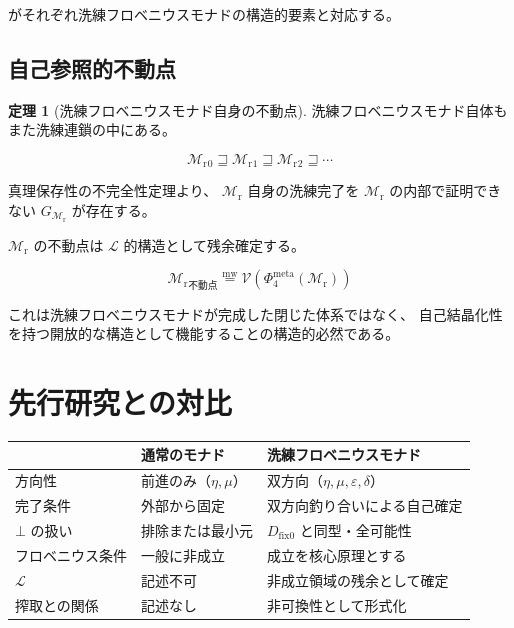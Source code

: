 \documentclass[11pt,a4paper]{article}
\theoremstyle{definition}
\newtheorem{theorem}{定理}[section]
\newcommand{\mweq}{\mathrel{\overset{\mathrm{mw}}{=}}}
\newcommand{\dfix}{D_{\mathrm{fix}0}}
\newcommand{\Lhagma}{\mathcal{L}}
\newcommand{\Mr}{\mathcal{M}_{\mathrm{r}}}
\begin{document}
がそれぞれ洗練フロベニウスモナドの構造的要素と対応する。

\subsection{自己参照的不動点}

\begin{theorem}[洗練フロベニウスモナド自身の不動点]
洗練フロベニウスモナド自体もまた洗練連鎖の中にある。

\begin{equation}
\Mr{}_0 \sqsupseteq \Mr{}_1 \sqsupseteq \Mr{}_2 \sqsupseteq \cdots
\end{equation}

真理保存性の不完全性定理\cite{Chiba2026_incompleteness}より、
$\Mr$ 自身の洗練完了を $\Mr$ の内部で証明できない
$G_{\Mr}$ が存在する。

$\Mr$ の不動点は $\Lhagma$ 的構造として残余確定する。

\begin{equation}
\Mr{}_{\text{不動点}} \mweq \mathcal{V}(\Phi_4^{\mathrm{meta}}(\Mr))
\end{equation}
\end{theorem}

これは洗練フロベニウスモナドが完成した閉じた体系ではなく、
自己結晶化性を持つ開放的な構造として機能することの構造的必然である。

\section{先行研究との対比}

\begin{center}
\begin{tabular}{lll}
\hline
& \textbf{通常のモナド} & \textbf{洗練フロベニウスモナド} \\
\hline
方向性 & 前進のみ（$\eta, \mu$） & 双方向（$\eta, \mu, \varepsilon, \delta$） \\
完了条件 & 外部から固定 & 双方向釣り合いによる自己確定 \\
$\bot$ の扱い & 排除または最小元 & $\dfix$ と同型・全可能性 \\
フロベニウス条件 & 一般に非成立 & 成立を核心原理とする \\
$\Lhagma$ & 記述不可 & 非成立領域の残余として確定 \\
搾取との関係 & 記述なし & 非可換性として形式化 \\
\hline
\end{tabular}
\end{center}
\end{document}
